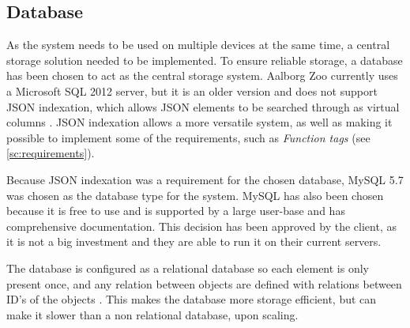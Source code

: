 \subsection{Database}\label{ssc:tech_database}
As the system needs to be used on multiple devices at the same time, a central storage solution needed to be implemented. To ensure reliable storage, a database has been chosen to act as the central storage system. Aalborg Zoo currently uses a Microsoft SQL 2012 server, but it is an older version and does not support JSON indexation, which allows JSON elements to be searched through as virtual columns \citep{MySQLJSON}. 
JSON indexation allows a more versatile system, as well as making it possible to implement some of the requirements, such as \textit{Function tags} (see \autoref{sc:requirements}).
\par
Because JSON indexation was a requirement for the chosen database, MySQL 5.7 was chosen as the database type for the system. MySQL has also been chosen because it is free to use and is supported by a large user-base and has comprehensive documentation. This decision has been approved by the client, as it is not a big investment and they are able to run it on their current servers.
\par
The database is configured as a relational database so each element is only present once, and any relation between objects are defined with relations between ID's of the objects \citep{RelationalDB}. 
This makes the database more storage efficient, but can make it slower than a non relational database, upon scaling.